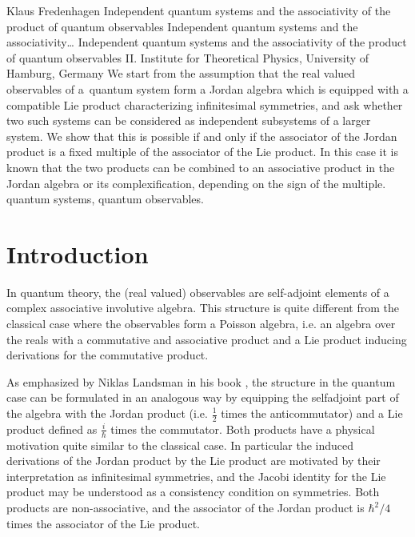 \begin{artengenv}{Klaus Fredenhagen}
	{Independent quantum systems and the associativity of the product of quantum observables}
	{Independent quantum systems and the associativity\ldots}
	{Independent quantum systems and the associativity of the product of quantum observables}
	{II. Institute for Theoretical Physics, University of Hamburg, Germany}
	{We start from the assumption that the real valued observables of a~quantum system form a Jordan algebra which is equipped with a compatible Lie product characterizing infinitesimal symmetries,
		and ask whether two such systems can be considered as independent subsystems of a larger system. We show that this  is possible if and only if the associator of the Jordan product is a fixed multiple of the associator of the Lie product. In this case it is known that the two products can be combined to an associative product in the Jordan algebra or its complexification, depending on the sign of the multiple.}
	{quantum systems, quantum observables.}
	
	

\section{Introduction}
\lettrine[loversize=0.13,lines=2,lraise=-0.05,nindent=0em,findent=0.2pt]%
{I}{}n quantum theory, the (real valued) observables are self-adjoint elements of a complex associative involutive algebra. This structure is quite different from the classical case where the observables form a Poisson algebra, i.e. an algebra over the reals with a commutative and associative product  and a Lie product inducing derivations for the commutative product. 

As emphasized by Niklas Landsman in his book \parencite*{Landsman}, the structure in the quantum case can be formulated in an analogous way by equipping the selfadjoint part of the algebra with the Jordan product (i.e. $\frac12$ times the anticommutator) and a Lie product defined as $\frac{i}{\hbar}$ times the commutator.
Both products have a physical motivation quite similar to the classical case. In particular the induced derivations of the Jordan product by the Lie product are motivated by their interpretation as infinitesimal symmetries, and the Jacobi identity for the Lie product may be understood as a consistency condition on symmetries. Both products are non-associative, and the associator of the Jordan product is $\hbar^2/4$ times the associator of the Lie product. 


\end{artengenv}
